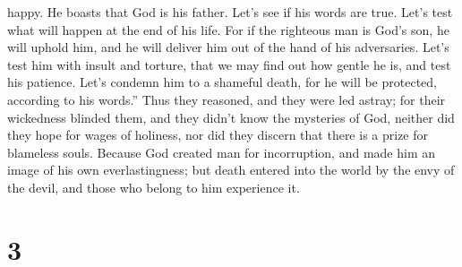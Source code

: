 happy. He boasts that God is his father.  Let's see if
his words are true. Let's test what will happen at the end of his life.
 For if the righteous man is God's son, he will uphold
him, and he will deliver him out of the hand of his adversaries.
 Let's test him with insult and torture, that we may find
out how gentle he is, and test his patience.  Let's
condemn him to a shameful death, for he will be protected, according to
his words.''  Thus they reasoned, and they were led
astray; for their wickedness blinded them,  and they
didn't know the mysteries of God, neither did they hope for wages of
holiness, nor did they discern that there is a prize for blameless
souls.  Because God created man for incorruption, and
made him an image of his own everlastingness;  but death
entered into the world by the envy of the devil, and those who belong to
him experience it.

\hypertarget{section-2}{%
\section{3}\label{section-2}}

